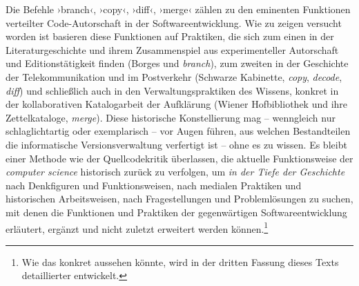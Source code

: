 \documentclass[a4paper,11pt]{article}
\newcommand{\inanf}[1]{›#1‹}
\begin{document}
Die Befehle \inanf{branch}, \inanf{copy}, \inanf{diff}, \inanf{merge} zählen zu den eminenten Funktionen verteilter Code-Autorschaft in der Softwareentwicklung. Wie zu zeigen versucht worden ist basieren diese Funktionen auf Praktiken, die sich zum einen in der Literaturgeschichte und ihrem Zusammenspiel aus experimenteller Autorschaft und Editionstätigkeit finden (Borges und \emph{branch}), zum zweiten in der Geschichte der Telekommunikation und im Postverkehr (Schwarze Kabinette, \emph{copy}, \emph{decode}, \emph{diff}) und schließlich auch in den Verwaltungspraktiken des Wissens, konkret in der kollaborativen Katalogarbeit der Aufklärung (Wiener Hofbibliothek und ihre Zettelkataloge, \emph{merge}). Diese historische Konstellierung mag – wenngleich nur schlaglichtartig oder exemplarisch – vor Augen führen, aus welchen Bestandteilen die informatische Versionsverwaltung verfertigt ist – ohne es zu wissen. Es bleibt einer Methode wie der Quellcodekritik überlassen, die aktuelle Funktionsweise der \emph{computer science} historisch zurück zu verfolgen, um \emph{in der Tiefe der Geschichte} nach Denkfiguren und Funktionsweisen, nach medialen Praktiken und historischen Arbeitsweisen, nach Fragestellungen und Problemlösungen zu suchen, mit denen die Funktionen und Praktiken der gegenwärtigen Softwareentwicklung erläutert, ergänzt und nicht zuletzt erweitert werden können.\footnote{Wie das konkret aussehen könnte, wird in der dritten Fassung dieses Texts detaillierter entwickelt.}

\printbibliography
\end{document}
